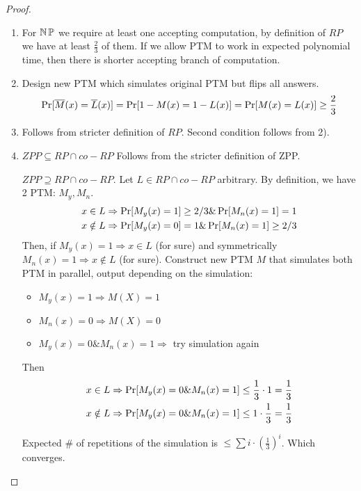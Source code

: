 \begin{proof}
    \begin{enumerate}
	    \item
		For $\operatorname{\operatorname{\mathbb{N}}\mathbb{P}}$ we require at least one accepting computation, by definition of $RP$ we have at least $\frac{2}{3}$ of them.
		If we allow PTM to work in expected polynomial time, then there is shorter accepting branch of computation.
        \item Design new PTM which simulates original PTM but flips all answers.
		\[ \operatorname{Pr}[\overline{M}(x) = \overline{L}(x)] = \operatorname{Pr}[1 - M(x) = 1 - L(x)] = \operatorname{Pr}[M(x) = L(x)] \geq \frac{2}{3} \]
	\item Follows from stricter definition of $RP$. Second condition follows from 2).
        \item $ZPP \subseteq RP\cap co-RP$
		Follows from the stricter definition of ZPP.

		$ZPP \supseteq RP\cap co-RP$. Let $L \in RP\cap co-RP$ arbitrary.
		By definition, we have 2 PTM: $M_y, M_n$.
    		\begin{gather*}
			x\in L \Rightarrow \operatorname{Pr}[M_y(x)=1] \geq 2/3 \& \operatorname{Pr}[M_n(x)=1] = 1\\
			x \notin L\Rightarrow\operatorname{Pr}[M_y(x)=0]=1 \& \operatorname{Pr}[M_n(x)=1] \geq 2/3
    		\end{gather*}
		Then, if $M_y(x) = 1 \Rightarrow x \in L$ (for sure) and symmetrically $M_n(x) = 1 \Rightarrow x \notin L$ (for sure).
		Construct new PTM $M$ that simulates both PTM in parallel, output depending on the simulation:
		\begin{itemize}
			\item $M_y(x) = 1 \Rightarrow M(X) = 1$
			\item $M_n(x) = 0 \Rightarrow M(X) = 0$
			\item $M_y(x) = 0 \& M_n(x) = 1 \Rightarrow$ try simulation again
		\end{itemize}

		Then
    		\begin{gather*}
			x \in L \Rightarrow \operatorname{Pr}[M_y(x) = 0 \& M_n(x) = 1] \leq \frac{1}{3} \cdot 1 = \frac{1}{3} \\
			x \notin L \Rightarrow \operatorname{Pr}[M_y(x) = 0 \& M_n(x) = 1] \leq 1 \cdot \frac{1}{3} = \frac{1}{3}
    		\end{gather*}

		Expected \# of repetitions of the simulation is $\leq \sum i \cdot (\frac{1}{3})^i$.
		Which converges.
    \end{enumerate}
\end{proof}

